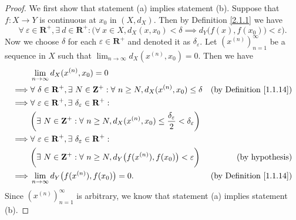 \begin{proof}
    We first show that statement (a) implies statement (b).
    Suppose that \(f : X \to Y\) is continuous at \(x_0\) in \((X, d_X)\).
    Then by Definition \ref{2.1.1} we have
    \[
        \forall\ \varepsilon \in \mathbf{R}^+, \exists\ d \in \mathbf{R}^+ : \Big(\forall\ x \in X, d_X(x, x_0) < \delta \implies d_Y\big(f(x), f(x_0)\big) < \varepsilon\Big).
    \]
    Now we choose \(\delta\) for each \(\varepsilon \in \mathbf{R}^+\) and denoted it as \(\delta_\varepsilon\).
    Let \((x^{(n)})_{n = 1}^\infty\) be a sequence in \(X\) such that \(\lim_{n \to \infty} d_X(x^{(n)}, x_0) = 0\).
    Then we have
    \begin{align*}
                 & \lim_{n \to \infty} d_X(x^{(n)}, x_0) = 0                                                                                                                                   \\
        \implies & \forall\ \delta \in \mathbf{R}^+, \exists\ N \in \mathbf{Z}^+ : \forall\ n \geq N, d_X(x^{(n)}, x_0) \leq \delta                      & \text{(by Definition \ref{1.1.14})} \\
        \implies & \forall\ \varepsilon \in \mathbf{R}^+, \exists\ \delta_\varepsilon \in \mathbf{R}^+ :                                                                                       \\
                 & \bigg(\exists\ N \in \mathbf{Z}^+ : \forall\ n \geq N, d_X(x^{(n)}, x_0) \leq \frac{\delta_\varepsilon}{2} < \delta_\varepsilon\bigg)                                       \\
        \implies & \forall\ \varepsilon \in \mathbf{R}^+, \exists\ \delta_\varepsilon \in \mathbf{R}^+ :                                                                                       \\
                 & \bigg(\exists\ N \in \mathbf{Z}^+ : \forall\ n \geq N, d_Y\big(f(x^{(n)}), f(x_0)\big) < \varepsilon\bigg)                            & \text{(by hypothesis)}              \\
        \implies & \lim_{n \to \infty} d_Y\big(f(x^{(n)}), f(x_0)\big) = 0.                                                                              & \text{(by Definition \ref{1.1.14})}
    \end{align*}
    Since \((x^{(n)})_{n = 1}^\infty\) is arbitrary, we know that statement (a) implies statement (b).


\end{proof}
